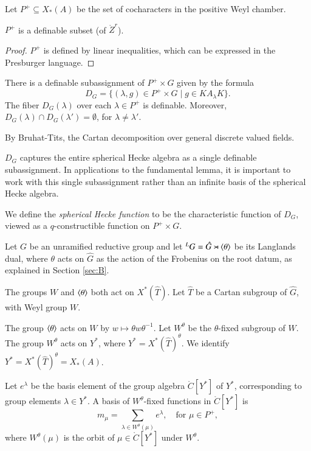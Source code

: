 Let $P^+\subseteq X_*(A)$ be the set of cocharacters in the positive Weyl chamber.

\begin{lemma} $P^+$ is a definable subset (of $\ring{Z}^r$).
\end{lemma}

\begin{proof} $P^+$ is defined by linear inequalities, which can be expressed in the Presburger language.
\end{proof}


\begin{lemma} There is a definable subassignment of $P^+\times G$ given by the formula
\[
D_G = \{(\lambda,g)\in P^+\times G \mid g \in K A_\lambda K \}.
\]
The fiber $D_G(\lambda)$ over each $\lambda\in P^+$ is definable.  Moreover,
$D_G(\lambda)\cap D_G(\lambda') = \emptyset$, for $\lambda\ne \lambda'$.
\end{lemma}

By Bruhat-Tits,  the Cartan decomposition over general discrete valued fields.

\begin{remark}   $D_G$ captures the entire spherical Hecke algebra as a single
definable subassignment.  In applications to the fundamental lemma, 
it is important to work with this single subassignment
rather than an infinite basis of the spherical Hecke algebra.
\end{remark}

We define the {\it spherical Hecke function} to be the characteristic function of $D_G$, viewed as a $q$-constructible function
on $P^+\times G$.

Let $G$ be an unramified reductive group and let ${}^LG = \hat G\rtimes \langle{\theta}\rangle$ be its Langlands dual, where
$\theta$ acts on $\hat G$ as the action of the Frobenius on the root datum, as explained in Section \ref{sec:B}.



The groups $W$ and $\langle{\theta}\rangle$ both act on $X^*(\hat T)$.  
Let $\hat T$ be a Cartan subgroup of $\hat G$, with Weyl group $W$.


The group $\langle{\theta}\rangle$ acts on $W$ by
$w\mapsto \theta w \theta^{-1}$.  
Let $W^\theta$
be the $\theta$-fixed subgroup of $W$.   
The group $W^\theta$ acts on $Y^*$,  where $Y^* = X^*(\hat T)^\theta$.
We identify $Y^* =X^*(\hat T)^\theta = X_*(A)$.

Let $e^\lambda$ be the basis element of  the group algebra $\ring{C}[Y^*]$ of $Y^*$, 
 corresponding to group elements $\lambda\in Y^*$.
A basis of $W^\theta$-fixed functions in $\ring{C}[Y^*]$ is 
\[
m_\mu = \sum_{\lambda\in W^\theta(\mu)} e^\lambda, \quad \text{for }\mu\in P^+,
\]
where $W^\theta(\mu)$ is the orbit of $\mu\in\ring{C}[Y^*]$ under $W^\theta$.


